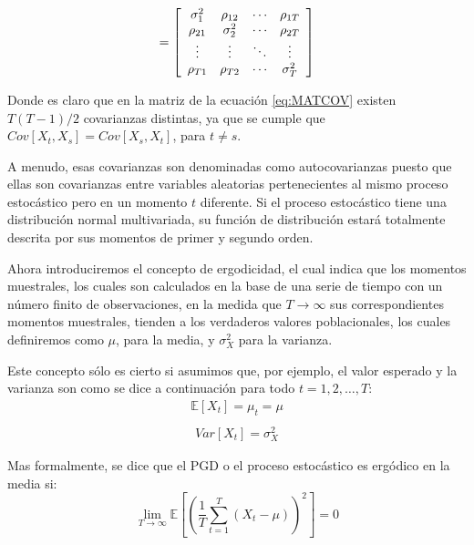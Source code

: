 \documentclass[
]{book}
\begin{document}
\begin{equation}
= \left[
    \begin{array}{c c c c}
    \sigma_1^2 & \rho_{12} & \cdots & \rho_{1T} \\
    \rho_{21} & \sigma_2^2 & \cdots & \rho_{2T} \\
    \vdots & \vdots & \ddots & \vdots \\
    \rho_{T1} & \rho_{T2} & \cdots & \sigma_T^2 \\
    \end{array}
\right]
    \label{eq:MATCOV}
\end{equation}

Donde es claro que en la matriz de la ecuación \eqref{eq:MATCOV} existen \(T(T-1)/2\) covarianzas distintas, ya que se cumple que \(Cov[X_t,X_s] = Cov[X_s,X_t]\), para \(t \neq s\).

A menudo, esas covarianzas son denominadas como autocovarianzas puesto que ellas son covarianzas entre variables aleatorias pertenecientes al mismo proceso estocástico pero en un momento \(t\) diferente. Si el proceso estocástico tiene una distribución normal multivariada, su función de distribución estará totalmente descrita por sus momentos de primer y segundo orden.

Ahora introduciremos el concepto de ergodicidad, el cual indica que los momentos muestrales, los cuales son calculados en la base de una serie de tiempo con un número finito de observaciones, en la medida que \(T \rightarrow \infty\) sus correspondientes momentos muestrales, tienden a los verdaderos valores poblacionales, los cuales definiremos como \(\mu\), para la media, y \(\sigma^2_X\) para la varianza.

Este concepto sólo es cierto si asumimos que, por ejemplo, el valor esperado y la varianza son como se dice a continuación para todo \(t = 1, 2, \ldots, T\):
\begin{eqnarray}
    \mathbb{E}[X_t] = \mu_t = \mu \\
    \label{eq:ESPERANZA}
\end{eqnarray}
\begin{eqnarray}
    Var[X_t] = \sigma^2_X
    \label{eq:VARIANZA}
\end{eqnarray}

Mas formalmente, se dice que el PGD o el proceso estocástico es ergódico en la media si:
\begin{equation}
    \displaystyle\lim_{T \to \infty}{\mathbb{E} \left[ \left( \frac{1}{T} \sum^{T}_{t = 1} (X_t - \mu) \right) ^2 \right]} = 0
    \label{eq:LIM1}
\end{equation}
\end{document}
